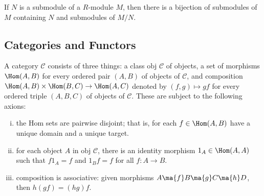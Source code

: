 \begin{thm}
If $N$ is a submodule of a $R$-module $M$, then there is a bijection of submodules of $M$ containing $N$ and submodules of $M/N$. 
\end{thm}


\subsection{Categories and Functors}

\begin{dfn}[Category]
A category $\mathcal{C}$ consists of three things: a class $\text{obj }\mathcal{C}$ of objects, a set of morphisms $\Hom(A,B)$ for every ordered pair $(A,B)$ of objects of $\mathcal{C}$, and composition $\Hom(A,B) \times \Hom(B,C) \to \Hom(A,C)$ denoted by $(f,g) \mapsto gf$ for every ordered triple $(A,B,C)$ of objects of $\mathcal{C}$. These are subject to the following axions:
	\begin{enumerate}[(i)]
	\item the Hom sets are pairwise disjoint; that is, for each $f \in \Hom(A,B)$ have a unique domain and a unique target. 
	\item for each object $A$ in $\text{obj }\mathcal{C}$, there is an identity morphism $1_A \in \Hom(A,A)$ such that $f1_A=f$ and $1_Bf=f$ for all $f: A \to B$.
	\item composition is associative: given morphisms $A \ma{f} B \ma{g} C \ma{h} D$, then $h(gf)=(hg)f$.
	\end{enumerate}
\end{dfn}


